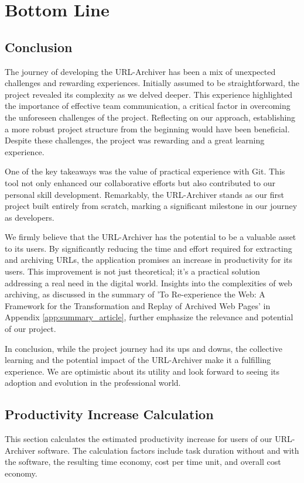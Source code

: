 \section{Bottom Line}

\subsection{Conclusion}
The journey of developing the URL-Archiver has been a mix of unexpected challenges and rewarding experiences.
Initially assumed to be straightforward, the project revealed its complexity as we delved deeper.
This experience highlighted the importance of effective team communication, a critical factor in overcoming the unforeseen challenges of the project.
Reflecting on our approach, establishing a more robust project structure from the beginning would have been beneficial.
Despite these challenges, the project was rewarding and a great learning experience.

One of the key takeaways was the value of practical experience with Git.
This tool not only enhanced our collaborative efforts but also contributed to our personal skill development.
Remarkably, the URL-Archiver stands as our first project built entirely from scratch, marking a significant milestone in our journey as developers.

We firmly believe that the URL-Archiver has the potential to be a valuable asset to its users.
By significantly reducing the time and effort required for extracting and archiving URLs, the application promises an increase in productivity for its users.
This improvement is not just theoretical; it's a practical solution addressing a real need in the digital world. Insights into the complexities of web archiving, as discussed in the summary of 'To Re-experience the Web: A Framework for the
Transformation and Replay of Archived Web Pages' \cite{berlin2023reexperience} in Appendix \ref{app:summary_article}, further emphasize the relevance and potential of our project.

In conclusion, while the project journey had its ups and downs, the collective learning and the potential impact of the URL-Archiver make it a fulfilling experience.
We are optimistic about its utility and look forward to seeing its adoption and evolution in the professional world.

\subsection{Productivity Increase Calculation}
This section calculates the estimated productivity increase for users of our URL-Archiver software.
The calculation factors include task duration without and with the software, the resulting time economy, cost per time unit, and overall cost economy.

